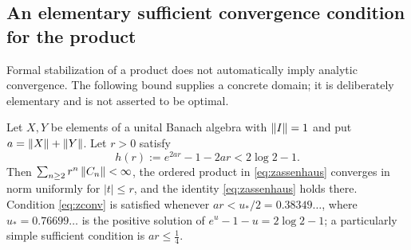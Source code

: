 \subsection{An elementary sufficient convergence condition for the product}
Formal stabilization of a product does not automatically imply analytic
convergence. The following bound supplies a concrete domain; it is
deliberately elementary and is not asserted to be optimal.
\begin{theorem}\label{thm:zconv}
Let $X,Y$ be elements of a unital Banach algebra with $\left\lVert I\right\rVert=1$ and put
$a=\left\lVert X\right\rVert+\left\lVert Y\right\rVert$. Let $r>0$ satisfy
\begin{equation}\label{eq:zconv}
 h(r):=e^{2ar}-1-2ar<2\log2-1.
\end{equation}
Then $\sum_{n\geq2}r^n\left\lVert C_n\right\rVert<\infty$, the ordered product in
\eqref{eq:zassenhaus} converges in norm uniformly for $|t|\leq r$, and the
identity \eqref{eq:zassenhaus} holds there. Condition \eqref{eq:zconv} is
satisfied whenever $ar<u_*/2=0.38349\ldots$, where $u_*=0.76699\ldots$ is
the positive solution of $e^{u}-1-u=2\log2-1$; a particularly simple
sufficient condition is $ar\leq\tfrac14$.
\end{theorem}
